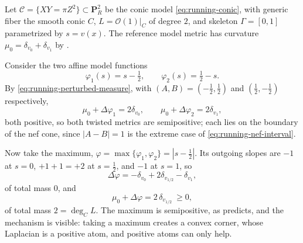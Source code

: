 \begin{example}
\label{ex:metrics-max-skeleton}
Let $\mathcal C=\{XY=\pi Z^2\}\subset\mathbf P^2_R$ be the conic model
\eqref{eq:running-conic}, with generic fiber the smooth conic $C$,
$L=\mathcal O(1)|_C$ of degree $2$, and skeleton
$\Gamma=[0,1]$ parametrized by $s=v(x)$. The reference model metric has
curvature $\mu_0=\delta_{v_0}+\delta_{v_1}$ by
.

Consider the two affine model functions
\[
 \varphi_1(s)=s-\tfrac12,\qquad \varphi_2(s)=\tfrac12-s .
\]
By \eqref{eq:running-perturbed-measure}, with $(A,B)=(-\tfrac12,\tfrac12)$
and $(\tfrac12,-\tfrac12)$ respectively,
\[
 \mu_0+\Delta\varphi_1=2\delta_{v_0},
 \qquad
 \mu_0+\Delta\varphi_2=2\delta_{v_1},
\]
both positive, so both twisted metrics are semipositive; each lies on the
boundary of the nef cone, since $|A-B|=1$ is the extreme case of
\eqref{eq:running-nef-interval}.

Now take the maximum, $\varphi=\max\{\varphi_1,\varphi_2\}=|s-\tfrac12|$.
Its outgoing slopes are $-1$ at $s=0$, $+1+1=+2$ at $s=\tfrac12$,
and $-1$ at $s=1$, so
\[
 \Delta\varphi=-\delta_{v_0}+2\delta_{v_{1/2}}-\delta_{v_1},
\]
of total mass $0$, and
\[
 \mu_0+\Delta\varphi=2\,\delta_{v_{1/2}}\ \ge0 ,
\]
of total mass $2=\deg_CL$. The maximum is semipositive, as
 predicts, and the mechanism is visible: taking
a maximum creates a convex corner, whose Laplacian is a positive atom, and
positive atoms can only help.


\end{example}
